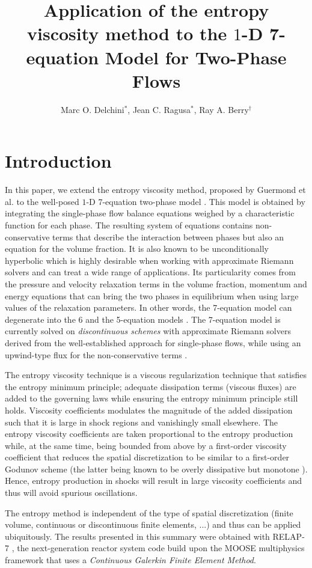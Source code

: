 \documentclass{anstrans}
\title{Application of the entropy viscosity method to the $1$-D 7-equation Model for Two-Phase Flows}
\author{Marc O. Delchini$^{*}$, Jean C. Ragusa$^{*}$, Ray A. Berry$^\dagger$}
\institute{
$^{*}$Department of Nuclear Engineering, Texas A\&M University, 
$^\dagger$Idaho National Laboratory
}
\begin{document}
\section{Introduction}
%
In this paper, we extend the entropy viscosity method, proposed by Guermond et al. \cite{jlg1, jlg2}
to the well-posed $1$-D 7-equation two-phase model \cite{DEM, berry}. This model is obtained by integrating the single-phase flow balance equations weighed by a characteristic function for each phase. The resulting system of equations contains non-conservative terms that describe the interaction between phases but also an equation for the volume fraction. It is also known to be unconditionally hyperbolic which is highly desirable when working with approximate Riemann solvers and can treat a wide range of applications. Its particularity comes from the pressure and velocity relaxation terms in the volume fraction, momentum and energy equations that can bring the two phases in equilibrium when using large values of the relaxation parameters. In other words, the 7-equation model can degenerate into the 6 \cite{Toumi_1996} and the 5-equation models \cite{Kapila_2001}. The 7-equation model is currently solved on \emph{discontinuous schemes} with approximate Riemann solvers derived from the well-established approach for single-phase flows, while using an upwind-type flux for the non-conservative terms \cite{Saurel_2001a, Saurel_2001b, Li_2004, Zein_2010, Ambroso_2012}. 

The entropy viscosity technique is a viscous regularization technique
that satisfies the entropy minimum principle; adequate dissipation terms (viscous fluxes)
are added to the governing laws while ensuring the entropy minimum principle still holds.
Viscosity coefficients modulates the magnitude of the added dissipation such that it is
large in shock regions and vanishingly small elsewhere. The entropy viscosity coefficients
are taken proportional to the entropy production while, at the same time, being bounded
from above by a first-order viscosity coefficient that reduces the spatial discretization
to be similar to a first-order Godunov scheme (the latter being known to be overly dissipative but
monotone \cite{toro}). Hence, entropy production in shocks will result in large viscosity  
coefficients and thus will avoid spurious oscillations. 

The entropy method is independent of the type of spatial discretization (finite volume,
continuous or discontinuous finite elements, ...) and thus can be applied ubiquitously. 
The results presented in this summary were obtained with RELAP-7 \cite{Berry_2014}, the next-generation 
reactor system code build upon the MOOSE multiphysics framework
\cite{moose} that uses a \emph{Continuous Galerkin Finite Element Method}.
\end{document}
